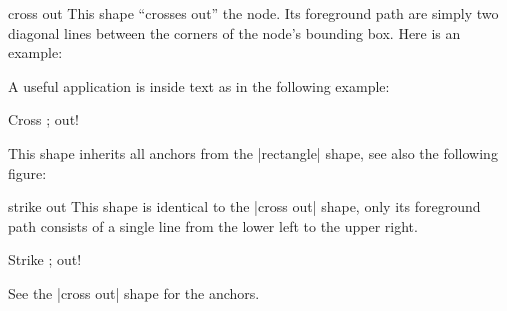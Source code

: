 \begin{shape}{cross out}
  This shape ``crosses out'' the node. Its foreground path are simply
  two diagonal lines between the corners of the node's bounding
  box. Here is an example:

\begin{codeexample}[]
\end{codeexample}

  A useful application is inside text as in the following example:
\begin{codeexample}[]
Cross \tikz[baseline] ; out!
\end{codeexample}

  This shape inherits all anchors from the |rectangle| shape, see also
  the following figure:
\begin{codeexample}[]
\Huge
{}
\end{codeexample}
\end{shape}

\begin{shape}{strike out}
  This shape is identical to the |cross out| shape, only its foreground
  path consists of a single line from the lower left to the upper
  right.

\begin{codeexample}[]
Strike \tikz[baseline] ; out!
\end{codeexample}

  See the |cross out| shape for the anchors.
\end{shape}




